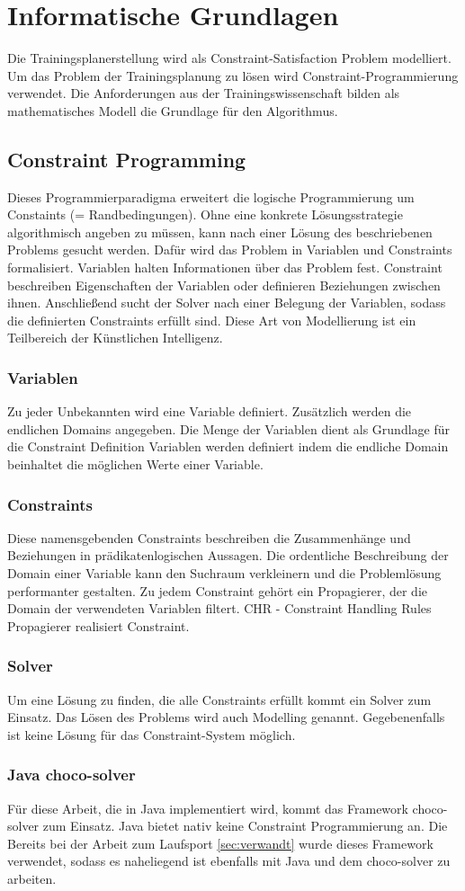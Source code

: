 \chapter{Informatische Grundlagen}
\label{sec:grundlagen:info}
Die Trainingsplanerstellung wird als Constraint-Satisfaction Problem modelliert.
Um das Problem der Trainingsplanung zu lösen wird Constraint-Programmierung verwendet.\cite{ConstraintProgrammierung} Die Anforderungen aus der Trainingswissenschaft bilden als mathematisches Modell die Grundlage für den Algorithmus. 
\section{Constraint Programming}
Dieses Programmierparadigma erweitert die logische Programmierung um Constaints (= Randbedingungen). Ohne eine konkrete Lösungsstrategie algorithmisch angeben zu müssen, kann nach einer Lösung des beschriebenen Problems gesucht werden. Dafür wird das Problem in Variablen und Constraints formalisiert. Variablen halten Informationen über das Problem fest. Constraint beschreiben Eigenschaften der Variablen oder definieren Beziehungen zwischen ihnen. Anschließend sucht der Solver nach einer Belegung der Variablen, sodass die definierten Constraints erfüllt sind. Diese Art von Modellierung ist ein Teilbereich der Künstlichen Intelligenz.
\subsection{Variablen}
Zu jeder Unbekannten wird eine Variable definiert. Zusätzlich werden die endlichen Domains angegeben. Die Menge der Variablen dient als Grundlage für die Constraint Definition
Variablen werden definiert indem die endliche Domain beinhaltet die möglichen Werte einer Variable.
\subsection{Constraints}
Diese namensgebenden Constraints beschreiben die Zusammenhänge und Beziehungen in prädikatenlogischen Aussagen. Die ordentliche Beschreibung der Domain einer Variable kann den Suchraum verkleinern und die Problemlösung performanter gestalten. Zu jedem Constraint gehört ein Propagierer, der die Domain der verwendeten Variablen filtert.
CHR - Constraint Handling Rules
Propagierer realisiert Constraint.
\subsection{Solver}
Um eine Lösung zu finden, die alle Constraints erfüllt kommt ein Solver zum Einsatz. Das Lösen des Problems wird auch Modelling genannt. Gegebenenfalls ist keine Lösung für das Constraint-System möglich. 
\subsection{Java choco-solver}
Für diese Arbeit, die in Java \cite{arnold2005java} implementiert wird, kommt das Framework choco-solver \cite{ChocoSolverWeb} zum Einsatz. Java bietet nativ keine Constraint Programmierung an. Die Bereits bei der Arbeit zum Laufsport \ref{sec:verwandt} wurde dieses Framework verwendet, sodass es naheliegend ist ebenfalls mit Java und dem choco-solver zu arbeiten.